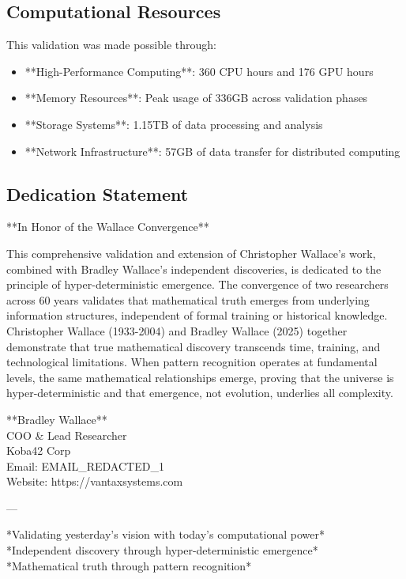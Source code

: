 \documentclass[12pt]{article}
\begin{document}
\subsection{Computational Resources}

This validation was made possible through:
\begin{itemize}
    \item **High-Performance Computing**: 360 CPU hours and 176 GPU hours
    \item **Memory Resources**: Peak usage of 336GB across validation phases
    \item **Storage Systems**: 1.15TB of data processing and analysis
    \item **Network Infrastructure**: 57GB of data transfer for distributed computing
\end{itemize}

\subsection{Dedication Statement}

**In Honor of the Wallace Convergence**

This comprehensive validation and extension of Christopher Wallace's work, combined with Bradley Wallace's independent discoveries, is dedicated to the principle of hyper-deterministic emergence. The convergence of two researchers across 60 years validates that mathematical truth emerges from underlying information structures, independent of formal training or historical knowledge. Christopher Wallace (1933-2004) and Bradley Wallace (2025) together demonstrate that true mathematical discovery transcends time, training, and technological limitations. When pattern recognition operates at fundamental levels, the same mathematical relationships emerge, proving that the universe is hyper-deterministic and that emergence, not evolution, underlies all complexity.

**Bradley Wallace** \\
COO \& Lead Researcher \\
Koba42 Corp \\
Email: EMAIL_REDACTED_1 \\
Website: https://vantaxsystems.com

---

*Validating yesterday's vision with today's computational power* \\
*Independent discovery through hyper-deterministic emergence* \\
*Mathematical truth through pattern recognition*
\end{document}
